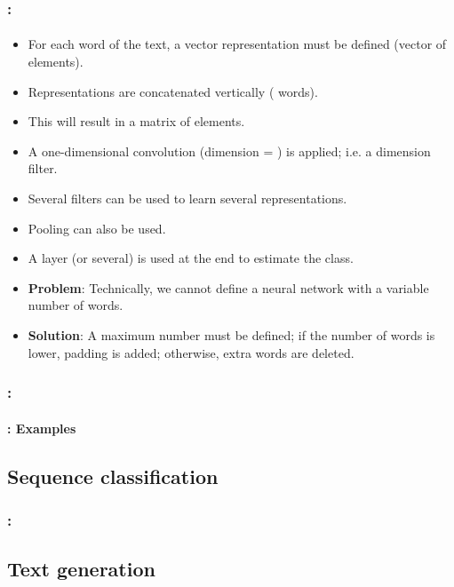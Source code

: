 \documentclass[xcolor=table]{beamer}
\begin{document}
\begin{frame}
	\frametitle{\insertshortsubtitle: \insertsection}
	\framesubtitle{\insertsubsection}
	
	\begin{itemize}
			\item For each word of the text, a vector representation must be defined (vector of  elements).
			\item Representations are concatenated vertically ( words).
			\item This will result in a matrix of  elements.
			\item A one-dimensional convolution (dimension = ) is applied; i.e. a  dimension filter.
			\item Several filters can be used to learn several representations.
			\item Pooling can also be used.
			\item A  layer (or several) is used at the end to estimate the class.
			\item \textbf{Problem}: Technically, we cannot define a neural network with a variable number of words.
			\item \textbf{Solution}: \textcolor{yellow!30}{A maximum number must be defined; if the number of words is lower, padding is added; otherwise, extra words are deleted.}
		\end{itemize}
	
\end{frame}

\begin{frame}
	\frametitle{\insertshortsubtitle: \insertsection}
	\framesubtitle{\insertsubsection: Examples}
	
	
\end{frame}

\subsection{Sequence classification}

\begin{frame}
	\frametitle{\insertshortsubtitle: \insertsection}
	\framesubtitle{\insertsubsection}
	
	
\end{frame}


\subsection{Text generation}
\end{document}
